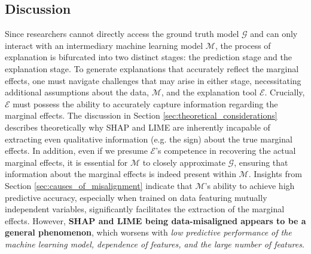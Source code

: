 \documentclass[12pt]{article}  %
\begin{document}
    \subsection{Discussion}
            Since researchers cannot directly access the ground truth model $\mathcal{G}$ and can only interact with an intermediary machine learning model $\mathcal{M}$, the process of explanation is bifurcated into two distinct stages: the prediction stage and the explanation stage. To generate explanations that accurately reflect the marginal effects, one must navigate challenges that may arise in either stage, necessitating additional assumptions about the data, $\mathcal{M}$, and the explanation tool $\mathcal{E}$. Crucially, $\mathcal{E}$ must possess the ability to accurately capture information regarding the marginal effects. The discussion in Section \ref{sec:theoretical_considerations} describes theoretically why SHAP and LIME are inherently incapable of extracting even qualitative information (e.g. the sign) about the true marginal effects. In addition, even if we presume $\mathcal{E}$'s competence in recovering the actual marginal effects, it is essential for $\mathcal{M}$ to closely approximate $\mathcal{G}$, ensuring that information about the marginal effects is indeed present within $\mathcal{M}$. Insights from Section \ref{sec:causes_of_misalignment} indicate that $\mathcal{M}$'s ability to achieve high predictive accuracy, especially when trained on data featuring mutually independent variables, significantly facilitates the extraction of the marginal effects. However, \textbf{SHAP and LIME being data-misaligned appears to be a general phenomenon}, which worsens with \textit{low predictive performance of the machine learning model, dependence of features, and the large number of features}. 


\end{document}
